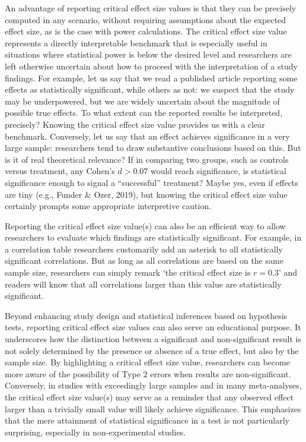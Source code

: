 \documentclass[
  man]{apa7}
\begin{document}
An advantage of reporting critical effect size values is that they can be precisely computed in any scenario, without requiring assumptions about the expected effect size, as is the case with power calculations. The critical effect size value represents a directly interpretable benchmark that is especially useful in situations where statistical power is below the desired level and researchers are left otherwise uncertain about how to proceed with the interpretation of a study findings. For example, let us say that we read a published article reporting some effects as statistically significant, while others as not: we suspect that the study may be underpowered, but we are widely uncertain about the magnitude of possible true effects. To what extent can the reported results be interpreted, precisely? Knowing the critical effect size value provides us with a clear benchmark. Conversely, let us say that an effect achieves significance in a very large sample: researchers tend to draw substantive conclusions based on this. But is it of real theoretical relevance? If in comparing two groups, such as controls versus treatment, any Cohen's \(d > 0.07\) would reach significance, is statistical significance enough to signal a ``successful'' treatment? Maybe yes, even if effects are tiny (e.g., Funder \& Ozer, 2019), but knowing the critical effect size value certainly prompts some appropriate interpretive caution.

Reporting the critical effect size value(s) can also be an efficient way to allow researchers to evaluate which findings are statistically significant. For example, in a correlation table researchers customarily add an asterisk to all statistically significant correlations. But as long as all correlations are based on the same sample size, researchers can simply remark `the critical effect size is \(r = 0.3\)' and readers will know that all correlations larger than this value are statistically significant.

Beyond enhancing study design and statistical inferences based on hypothesis tests, reporting critical effect size values can also serve an educational purpose. It underscores how the distinction between a significant and non-significant result is not solely determined by the presence or absence of a true effect, but also by the sample size. By highlighting a critical effect size value, researchers can become more aware of the possibility of Type 2 errors when results are non-significant. Conversely, in studies with exceedingly large samples and in many meta-analyses, the critical effect size value(s) may serve as a reminder that any observed effect larger than a trivially small value will likely achieve significance. This emphasizes that the mere attainment of statistical significance in a test is not particularly surprising, especially in non-experimental studies.
\end{document}
